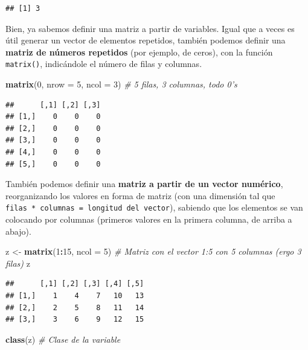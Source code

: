 \documentclass[11pt,]{book}
\newenvironment{Shaded}{\begin{snugshade}}{\end{snugshade}}
\newcommand{\CommentTok}[1]{\textcolor[rgb]{0.37,0.37,0.37}{\textit{#1}}}
\newcommand{\DataTypeTok}[1]{\textcolor[rgb]{0.27,0.27,0.27}{#1}}
\newcommand{\DecValTok}[1]{\textcolor[rgb]{0.06,0.06,0.06}{#1}}
\newcommand{\KeywordTok}[1]{\textcolor[rgb]{0.27,0.27,0.27}{\textbf{#1}}}
\newcommand{\NormalTok}[1]{#1}
\newcommand{\OperatorTok}[1]{\textcolor[rgb]{0.43,0.43,0.43}{\textbf{#1}}}
\newcommand{\StringTok}[1]{\textcolor[rgb]{0.5,0.5,0.5}{#1}}
\begin{document}
\begin{verbatim}
## [1] 3
\end{verbatim}

Bien, ya sabemos definir una matriz a partir de variables. Igual que a veces es útil generar un vector de elementos repetidos, también podemos definir una \textbf{matriz de números repetidos} (por ejemplo, de ceros), con la función \texttt{matrix()}, indicándole el número de filas y columnas.

\begin{Shaded}
\begin{Highlighting}[]
\KeywordTok{matrix}\NormalTok{(}\DecValTok{0}\NormalTok{, }\DataTypeTok{nrow =} \DecValTok{5}\NormalTok{, }\DataTypeTok{ncol =} \DecValTok{3}\NormalTok{) }\CommentTok{# 5 filas, 3 columnas, todo 0's}
\end{Highlighting}
\end{Shaded}

\begin{verbatim}
##      [,1] [,2] [,3]
## [1,]    0    0    0
## [2,]    0    0    0
## [3,]    0    0    0
## [4,]    0    0    0
## [5,]    0    0    0
\end{verbatim}

También podemos definir una \textbf{matriz a partir de un vector numérico}, reorganizando los valores en forma de matriz (con una dimensión tal que \texttt{filas\ *\ columnas\ =\ longitud\ del\ vector}), sabiendo que los elementos se van colocando por columnas (primeros valores en la primera columna, de arriba a abajo).

\begin{Shaded}
\begin{Highlighting}[]
\NormalTok{z <-}\StringTok{ }\KeywordTok{matrix}\NormalTok{(}\DecValTok{1}\OperatorTok{:}\DecValTok{15}\NormalTok{, }\DataTypeTok{ncol =} \DecValTok{5}\NormalTok{) }\CommentTok{# Matriz con el vector 1:5 con 5 columnas (ergo 3 filas)}
\NormalTok{z}
\end{Highlighting}
\end{Shaded}

\begin{verbatim}
##      [,1] [,2] [,3] [,4] [,5]
## [1,]    1    4    7   10   13
## [2,]    2    5    8   11   14
## [3,]    3    6    9   12   15
\end{verbatim}

\begin{Shaded}
\begin{Highlighting}[]
\KeywordTok{class}\NormalTok{(z) }\CommentTok{# Clase de la variable}
\end{Highlighting}
\end{Shaded}
\end{document}
